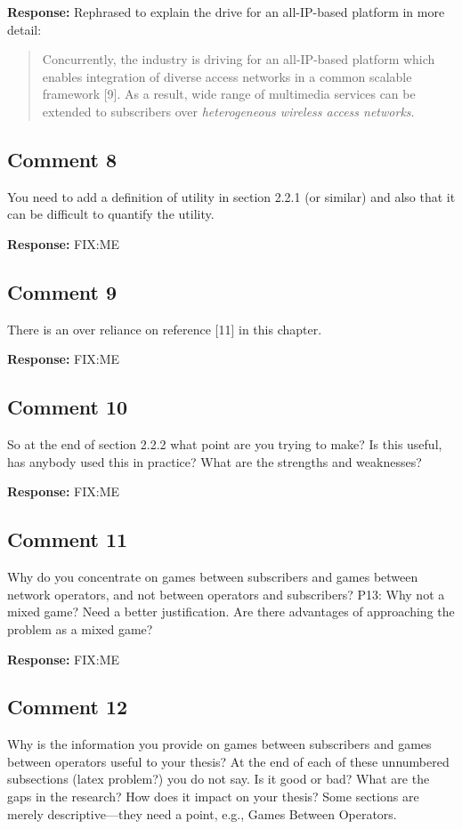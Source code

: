 \documentclass[10pt,a4paper,notitlepage]{article}
\numberwithin{equation}{section}
\begin{document}
\textbf{Response:}
Rephrased to explain the drive for an all-IP-based platform in more detail:
\begin{quote}
Concurrently, the industry is driving for an all-IP-based platform which enables integration of diverse access networks in a common scalable framework [9]. As a result, wide range of multimedia services can be extended to subscribers over \emph{heterogeneous wireless access networks}.
\end{quote}

\subsection{Comment 8}
You need to add a definition of utility in section 2.2.1 (or similar) and also that it can be difficult to quantify the utility.

\textbf{Response:}
FIX:ME

\subsection{Comment 9}
There is an over reliance on reference [11] in this chapter.

\textbf{Response:}
FIX:ME

\subsection{Comment 10}
So at the end of section 2.2.2 what point are you trying to make? Is this useful, has anybody used this in practice? What are the strengths and weaknesses?

\textbf{Response:}
FIX:ME

\subsection{Comment 11}
Why do you concentrate on games between subscribers and games between network operators, and not between operators and subscribers? P13: Why not a mixed game? Need a better justification. Are there advantages of approaching the problem as a mixed game?

\textbf{Response:}
FIX:ME

\subsection{Comment 12}
Why is the information you provide on games between subscribers and games between operators useful to your thesis? At the end of each of these unnumbered subsections (latex problem?) you do not say. Is it good or bad? What are the gaps in the research? How does it impact on your thesis? Some sections are merely descriptive---they need a point, e.g., Games Between Operators.
\end{document}
